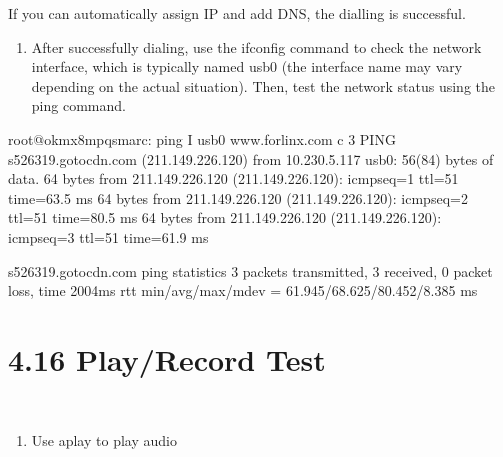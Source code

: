 \documentclass[letterpaper,10pt,openany,english]{sphinxmanual}
\begin{document}
\sphinxAtStartPar
If you can automatically assign IP and add DNS, the dialling is successful.
\begin{enumerate}
%
\setcounter{enumi}{2}
\item {} 
\sphinxAtStartPar
After successfully dialing, use the ifconfig command to check the network interface, which is typically named usb0 (the interface name may vary depending on the actual situation). Then, test the network status using the ping command.

\end{enumerate}

\begin{sphinxVerbatim}[commandchars=\\\{\}]
root@ok\PYGZhy{}mx8mpq\PYGZhy{}smarc:\PYGZti{}\PYGZsh{} ping \PYGZhy{}I usb0 www.forlinx.com \PYGZhy{}c 3
PING s\PYGZhy{}526319.gotocdn.com (211.149.226.120) from 10.230.5.117 usb0: 56(84) bytes of data.
64 bytes from 211.149.226.120 (211.149.226.120): icmp\PYGZus{}seq=1 ttl=51 time=63.5 ms
64 bytes from 211.149.226.120 (211.149.226.120): icmp\PYGZus{}seq=2 ttl=51 time=80.5 ms
64 bytes from 211.149.226.120 (211.149.226.120): icmp\PYGZus{}seq=3 ttl=51 time=61.9 ms

\PYGZhy{}\PYGZhy{}\PYGZhy{} s\PYGZhy{}526319.gotocdn.com ping statistics \PYGZhy{}\PYGZhy{}\PYGZhy{}
3 packets transmitted, 3 received, 0\PYGZpc{} packet loss, time 2004ms
rtt min/avg/max/mdev = 61.945/68.625/80.452/8.385 ms
\end{sphinxVerbatim}


\section{4.16 Play/Record Test}
\label{\detokenize{linux-manual:id5}}
\sphinxAtStartPar
{}\\
\begin{enumerate}
%
\item {} 
\sphinxAtStartPar
Use aplay to play audio

\end{enumerate}
\end{document}
